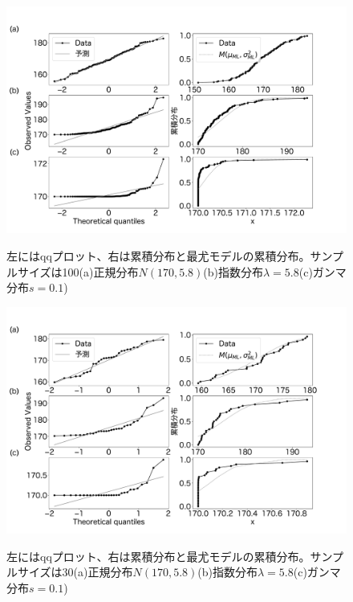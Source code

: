 \begin{figure}
    \begin{center}
        \includegraphics[width=15cm]{./image/12_/qq_cummlative_expon_norm_gamma.pdf}
        \label{fig:qq_cummlative}
        \caption{左にはqqプロット、右は累積分布と最尤モデルの累積分布。サンプルサイズは100(a)正規分布$N(170,5.8)$(b)指数分布$\lambda=5.8$(c)ガンマ分布$s=0.1$)}
    \end{center}
\end{figure}

\begin{figure}
 \begin{center}
  \includegraphics[width=15cm]{./image/12_/qq_cummlative_expon_norm_gammaN_30.pdf}
  \label{fig:qq_cummlative_30}
  \caption{左にはqqプロット、右は累積分布と最尤モデルの累積分布。サンプルサイズは30(a)正規分布$N(170,5.8)$(b)指数分布$\lambda=5.8$(c)ガンマ分布$s=0.1$)}
 \end{center}
\end{figure}


